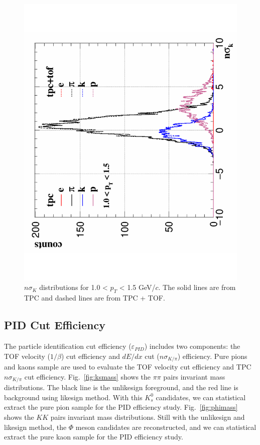 \documentclass[a4paper]{article}
\begin{document}
\begin{figure}[htbp]
\begin{minipage}[htbp]{0.52\linewidth}
\includegraphics[width=1.0\textwidth,angle=-90]{fig/tofMatch_Hijing_nSigmaK2.pdf} 
\caption{$n\sigma_{K}$ distributions for 1.0 < $p_T$ < 1.5 GeV/$c$. The solid lines are from TPC and dashed lines are from TPC + TOF.\label{fig:tpck3}}
\end{minipage}
\end{figure}

\subsection{PID Cut Efficiency}
\label{pideff}
The particle identification cut efficiency ($\varepsilon_{PID}$) includes two components: the TOF velocity ($1/\beta$) cut efficiency and $dE/dx$ cut ($n\sigma_{K/\pi}$) efficiency. Pure pions and kaons sample are used to evaluate the TOF velocity cut efficiency and TPC $n\sigma_{K/\pi}$ cut efficiency. Fig.~\ref{fig:ksmass} shows the $\pi\pi$ pairs invariant mass distributions. The black line is the unlikesign foreground, and the red line is background using likesign method. With this $K_{s}^{0}$ candidates, we can statistical extract the pure pion sample for the PID efficiency study. Fig.~\ref{fig:phimass} shows the $KK$ pairs invariant mass distributions. Still with the unlikesign and likesign method, the $\Phi$ meson candidates are reconstructed, and we can statistical extract the pure kaon sample for the PID efficiency study.
\end{document}
